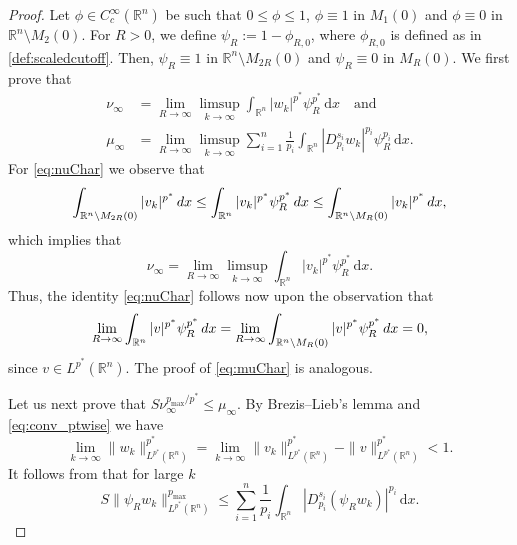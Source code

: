 \documentclass[11pt]{amsart}
\theoremstyle{plain}
\theoremstyle{definition}
\numberwithin{equation}{section}
\renewcommand{\d}{\textnormal{d}}
\newcommand{\R}{\mathbb{R}}
\begin{document}
\begin{proof}
Let $\phi \in C_c^{\infty}(\R^n)$ be such that $0 \le \phi \le 1$, $\phi \equiv 1$ in $M_1(0)$ and $\phi \equiv 0$ in $\R^n \setminus M_2(0)$. For $R > 0$, we define $\psi_R := 1 - \phi_{R,0}$, where $\phi_{R,0}$ is defined as in \eqref{def:scaledcutoff}. Then, $\psi_R \equiv 1$ in $\R^n \setminus M_{2R}(0)$ and $\psi_R \equiv 0$ in $M_{R}(0)$. We first prove that
\begin{align}
\label{eq:nuChar}
\nu_{\infty} &= \lim_{R \to \infty} \limsup_{k \to \infty} \int_{\mathbb{R}^n} |w_k|^{p^{\ast}} \psi_R^{p^{\ast}} \,\mathrm{d}x \quad\text{and}\\
\label{eq:muChar}
\mu_{\infty} &= \lim_{R \to \infty} \limsup_{k \to \infty} \sum_{i=1}^n \frac{1}{p_i} \int_{\mathbb{R}^n} |D^{s_i}_{p_i}w_k|^{p_i} \psi_R^{p_i} \,\mathrm{d}x.
\end{align}
For \eqref{eq:nuChar} we observe that 
\begin{equation*}
\int_{\R^n \setminus M_{2R}(0)} \vert v_k \vert^{p^{\ast}} \, \d x \le \int_{\R^n} \vert v_k \vert^{p^{\ast}} \psi_R^{p^{\ast}} \, \d x \le \int_{\R^n \setminus M_{R}(0)} \vert v_k \vert^{p^{\ast}}\, \d x,
\end{equation*}
which implies that
\begin{equation}
\label{eq:nuinftyrep1}
\nu_{\infty} = \lim_{R \to \infty} \limsup_{k \to \infty} \int_{\mathbb{R}^n} |v_k|^{p^{\ast}} \psi_R^{p^{\ast}} \,\mathrm{d}x.
\end{equation}
Thus, the identity \eqref{eq:nuChar} follows now upon the observation that
\begin{equation*}
\lim_{R \to \infty} \int_{\R^n} \vert v \vert^{p^{\ast}} \psi_R^{p^{\ast}} \, \d x = \lim_{R \to \infty} \int_{\R^n \setminus M_R(0)} \vert v \vert^{p^{\ast}} \psi_R^{p^{\ast}} \, \d x = 0,
\end{equation*}
since $v \in L^{p^{\ast}}(\R^n)$. The proof of \eqref{eq:muChar} is analogous.

Let us next prove that $S\nu_{\infty}^{p_{\max}/p^{\ast}} \leq \mu_{\infty}$.
By Brezis–Lieb’s lemma and \eqref{eq:conv_ptwise} we have \[\lim_{k\to\infty}\|w_k\|_{L^{p^{\ast}}(\R^n)}^{p^{\ast}} = \lim_{k\to\infty}\|v_k\|_{L^{p^{\ast}}(\R^n)}^{p^{\ast}}-\|v\|_{L^{p^{\ast}}(\R^n)}^{p^{\ast}}<1.\] It follows from  that for large $k$
\begin{equation*}
S\|\psi_R w_k\|_{L^{p^{\ast}}(\R^n)}^{p_{\max}} \leq \sum_{i=1}^n \frac{1}{p_i} \int_{\mathbb{R}^n} |D^{s_i}_{p_i}(\psi_R w_k)|^{p_i} \,\mathrm{d}x.
\end{equation*}


\end{proof}
\end{document}
